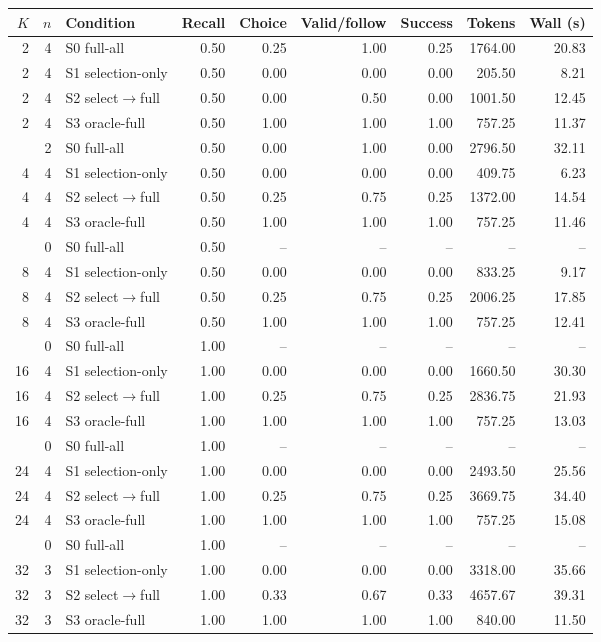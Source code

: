 \begin{tabular}{rrl r@{\hspace{1.1em}}r@{\hspace{1.1em}}r@{\hspace{1.1em}}r@{\hspace{1.1em}}r@{\hspace{1.1em}}r}
\toprule
$K$ & $n$ & Condition & Recall & Choice & Valid/follow & Success & Tokens & Wall (s) \\
\midrule
2 & 4 & S0 full-all & 0.50 & 0.25 & 1.00 & 0.25 & 1764.00 & 20.83 \\
2 & 4 & S1 selection-only & 0.50 & 0.00 & 0.00 & 0.00 & 205.50 & 8.21 \\
2 & 4 & S2 select$\rightarrow$full & 0.50 & 0.00 & 0.50 & 0.00 & 1001.50 & 12.45 \\
2 & 4 & S3 oracle-full & 0.50 & 1.00 & 1.00 & 1.00 & 757.25 & 11.37 \\
\addlinespace
4 & 2 & S0 full-all & 0.50 & 0.00 & 1.00 & 0.00 & 2796.50 & 32.11 \\
4 & 4 & S1 selection-only & 0.50 & 0.00 & 0.00 & 0.00 & 409.75 & 6.23 \\
4 & 4 & S2 select$\rightarrow$full & 0.50 & 0.25 & 0.75 & 0.25 & 1372.00 & 14.54 \\
4 & 4 & S3 oracle-full & 0.50 & 1.00 & 1.00 & 1.00 & 757.25 & 11.46 \\
\addlinespace
8 & 0 & S0 full-all & 0.50 & -- & -- & -- & -- & -- \\
8 & 4 & S1 selection-only & 0.50 & 0.00 & 0.00 & 0.00 & 833.25 & 9.17 \\
8 & 4 & S2 select$\rightarrow$full & 0.50 & 0.25 & 0.75 & 0.25 & 2006.25 & 17.85 \\
8 & 4 & S3 oracle-full & 0.50 & 1.00 & 1.00 & 1.00 & 757.25 & 12.41 \\
\addlinespace
16 & 0 & S0 full-all & 1.00 & -- & -- & -- & -- & -- \\
16 & 4 & S1 selection-only & 1.00 & 0.00 & 0.00 & 0.00 & 1660.50 & 30.30 \\
16 & 4 & S2 select$\rightarrow$full & 1.00 & 0.25 & 0.75 & 0.25 & 2836.75 & 21.93 \\
16 & 4 & S3 oracle-full & 1.00 & 1.00 & 1.00 & 1.00 & 757.25 & 13.03 \\
\addlinespace
24 & 0 & S0 full-all & 1.00 & -- & -- & -- & -- & -- \\
24 & 4 & S1 selection-only & 1.00 & 0.00 & 0.00 & 0.00 & 2493.50 & 25.56 \\
24 & 4 & S2 select$\rightarrow$full & 1.00 & 0.25 & 0.75 & 0.25 & 3669.75 & 34.40 \\
24 & 4 & S3 oracle-full & 1.00 & 1.00 & 1.00 & 1.00 & 757.25 & 15.08 \\
\addlinespace
32 & 0 & S0 full-all & 1.00 & -- & -- & -- & -- & -- \\
32 & 3 & S1 selection-only & 1.00 & 0.00 & 0.00 & 0.00 & 3318.00 & 35.66 \\
32 & 3 & S2 select$\rightarrow$full & 1.00 & 0.33 & 0.67 & 0.33 & 4657.67 & 39.31 \\
32 & 3 & S3 oracle-full & 1.00 & 1.00 & 1.00 & 1.00 & 840.00 & 11.50 \\
\bottomrule
\end{tabular}
